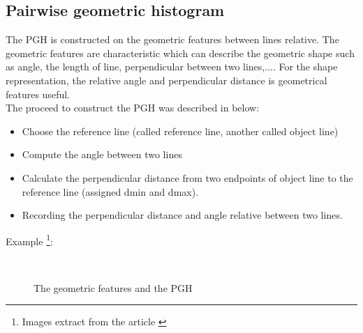 \subsection{Pairwise geometric histogram}
The PGH is constructed on the geometric features between lines relative. The geometric features are characteristic which can describe the geometric shape such as angle, the length of line, perpendicular between two lines,.... For the shape representation, the relative angle and perpendicular distance is geometrical features useful. \\
The proceed to construct the PGH was described in below:
\begin{itemize}
\item Choose the reference line (called reference line, another called object line)
\item Compute the angle between two lines
\item Calculate the perpendicular distance from two endpoints of object line to the reference line (assigned dmin and dmax).
\item Recording the perpendicular distance and angle relative between two lines.
\end{itemize}
Example \footnote{Images extract from the article \cite{palaniswamy2010automatic}}:\\
\begin{figure}[h!]
\centering
{}~~
\caption{The geometric features and the PGH}
\label{fig:figure_31}
\end{figure}
